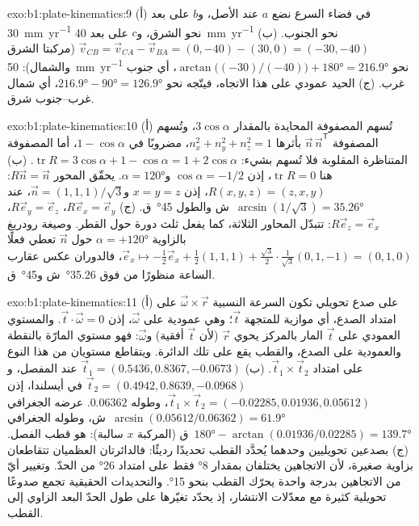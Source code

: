 \begin{solution}{exo:b1:plate-kinematics:9}
(أ) في فضاء السرع نضع $a$ عند الأصل، و$b$ على بعد \qty{30}{mm.yr^{-1}} نحو الشرق، و$c$ على بعد \qty{40}{mm.yr^{-1}} نحو الجنوب. (ب) $\vec v_{CB} =
\vec v_{CA} - \vec v_{BA} = (0, -40) - (30, 0) = (-30, -40)$ (مركبتا الشرق والشمال): \qty{50}{mm.yr^{-1}} نحو 
$\arctan\bigl((-30)/(-40)\bigr) + \ang{180} = \ang{216.9}$، أي جنوب غرب. (ج) الحيد عمودي على هذا الاتجاه، فيتّجه نحو
$\ang{216.9} - \ang{90} = \ang{126.9}$، أي شمال غرب–جنوب شرق.
\end{solution}

\begin{solution}{exo:b1:plate-kinematics:10}
(أ) تُسهم المصفوفة المحايدة بالمقدار $3\cos\alpha$، وتُسهم المصفوفة $\vec n\,\vec n^{\mathsf T}$ بأثرها $n_x^2 + n_y^2 + n_z^2 = 1$، مضروبًا في $1 - \cos\alpha$، أما المصفوفة المتناظرة المقلوبة فلا تُسهم بشيء: $\operatorname{tr}R =
3\cos\alpha + 1 - \cos\alpha = 1 + 2\cos\alpha$. (ب) هنا $\operatorname{tr}R = 0$،
إذن $\cos\alpha = -1/2$ و$\alpha = \ang{120}$. يحقّق المحور $R\vec n =
\vec n$: $R(x, y, z) = (z, x, y)$، إذن $x = y = z$ و$\vec n =
(1, 1, 1)/\sqrt3$، عند  $\arcsin(1/\sqrt3) = \ang{35.26}$~ش والطول \ang{45}~ق. (ج) $R\vec e_x = \vec e_y$، $R\vec e_y = \vec e_z$،
$R\vec e_z = \vec e_x$: تتبدّل المحاور الثلاثة، كما يفعل ثلث دورة حول القطر. وصيغة رودريغ بالزاوية $\alpha = +\ang{120}$ حول $\vec n$ تعطي فعلًا
$\vec e_x\mapsto -\tfrac12\vec e_x + \tfrac12(1, 1, 1) +
\tfrac{\sqrt3}{2}\cdot\tfrac{1}{\sqrt3}(0, 1, -1) = (0, 1, 0)$، فالدوران عكس عقارب الساعة منظورًا من فوق \ang{35.26}~ش و\ang{45}~ق.
\end{solution}

\begin{solution}{exo:b1:plate-kinematics:11}
(أ) على صدع تحويلي تكون السرعة النسبية $\vec\omega\times\vec r$ على امتداد الصدع، أي موازية للمتجهة $\vec t$؛ وهي عمودية على $\vec\omega$، إذن $\vec t\cdot\vec\omega = 0$. والمستوي العمودي على $\vec t$ المار بالمركز يحوي $\vec r$ (لأن $\vec t$ أفقية) و$\vec\omega$: فهو مستوي  المارّة بالنقطة والعمودية على الصدع، والقطب يقع على تلك الدائرة. ويتقاطع مستويان من هذا النوع على امتداد $\vec t_1\times\vec t_2$. (ب) $\vec t_1 = (0.5436, 0.8367, -0.0673)$ عند المفصل، و$\vec t_2 = (0.4942, 0.8639, -0.0968)$ في أيسلندا، إذن $\vec t_1\times\vec t_2 = (-0.02285, 0.01936, 0.05612)$، وطوله $0.06362$. عرضه الجغرافي $\arcsin(0.05612/0.06362) = \ang{61.9}$~ش، وطوله الجغرافي $\ang{180} - \arctan(0.01936/0.02285) = \ang{139.7}$~ق (المركبة $x$ سالبة): هو قطب الفصل. (ج) بصدعين تحويليين وحدهما يُحدَّد القطب تحديدًا رديئًا: فالدائرتان العظميان تتقاطعان بزاوية صغيرة، لأن الاتجاهين يختلفان بمقدار \ang{8} فقط على امتداد \ang{26} من الحدّ. وتغيير أيّ من الاتجاهين بدرجة واحدة يحرّك القطب بنحو \ang{15}. والتحديدات الحقيقية تجمع صدوعًا تحويلية كثيرة مع معدّلات الانتشار، إذ يحدّد تغيّرها على طول الحدّ البعد الزاوي إلى القطب.
\end{solution}

